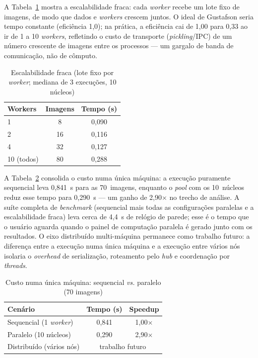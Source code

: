 \documentclass[12pt]{article}
\begin{document}
A Tabela~\ref{tab:escalafraca} mostra a escalabilidade fraca: cada \textit{worker}
recebe um lote fixo de imagens, de modo que dados e \textit{workers} crescem
juntos. O ideal de Gustafson \cite{gustafson1988} seria tempo constante
(eficiência 1,0); na prática, a eficiência cai de 1,00 para 0,33 ao ir de 1 a 10
\textit{workers}, refletindo o custo de transporte (\textit{pickling}/IPC) de um
número crescente de imagens entre os processos --- um gargalo de banda de
comunicação, não de cômputo.

\begin{table}[ht]
\centering
\caption{Escalabilidade fraca (lote fixo por \textit{worker}; mediana de 3 execuções, 10 núcleos)}
\label{tab:escalafraca}
\begin{tabular}{lcc}
\toprule
\textbf{Workers} & \textbf{Imagens} & \textbf{Tempo (s)} \\
\midrule
1          & 8  & 0{,}090 \\
2          & 16 & 0{,}116 \\
4          & 32 & 0{,}127 \\
10 (todos) & 80 & 0{,}288 \\
\bottomrule
\end{tabular}
\end{table}

A Tabela~\ref{tab:overhead} consolida o custo numa única máquina: a execução
puramente sequencial leva 0,841~s para as 70~imagens, enquanto o \textit{pool}
com os 10~núcleos reduz esse tempo para 0,290~s --- um ganho de 2,90$\times$ no
trecho de análise. A suíte completa de \textit{benchmark} (sequencial mais todas
as configurações paralelas e a escalabilidade fraca) leva cerca de 4,4~s de
relógio de parede; esse é o tempo que o usuário aguarda quando o painel de
computação paralela é gerado junto com os resultados. O eixo distribuído
multi-máquina permanece como trabalho futuro: a diferença entre a execução numa
única máquina e a execução entre vários nós isolaria o \textit{overhead} de
serialização, roteamento pelo \textit{hub} e coordenação por \textit{threads}.

\begin{table}[ht]
\centering
\caption{Custo numa única máquina: sequencial \textit{vs.} paralelo (70 imagens)}
\label{tab:overhead}
\begin{tabular}{lcc}
\toprule
\textbf{Cenário} & \textbf{Tempo (s)} & \textbf{Speedup} \\
\midrule
Sequencial (1 \textit{worker})        & 0{,}841 & 1{,}00$\times$ \\
Paralelo (10 núcleos)                 & 0{,}290 & 2{,}90$\times$ \\
Distribuído (vários nós)              & \multicolumn{2}{c}{trabalho futuro} \\
\bottomrule
\end{tabular}
\end{table}
\end{document}

